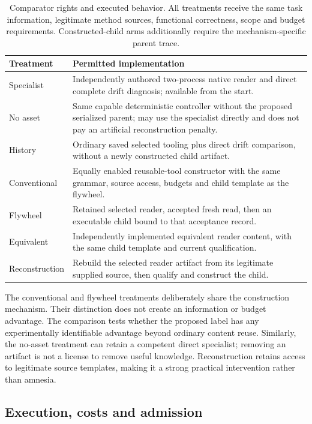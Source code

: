 \documentclass[11pt,a4paper]{article}
\begin{document}
\begin{table}[htbp]\centering\small
\caption{Comparator rights and executed behavior. All treatments receive the same task information, legitimate method sources, functional correctness, scope and budget requirements. Constructed-child arms additionally require the mechanism-specific parent trace.}
\label{tab:arms}
\begin{tabularx}{\textwidth}{@{}l X@{}}\toprule
Treatment & Permitted implementation\\\midrule
Specialist & Independently authored two-process native reader and direct complete drift diagnosis; available from the start.\\
No asset & Same capable deterministic controller without the proposed serialized parent; may use the specialist directly and does not pay an artificial reconstruction penalty.\\
History & Ordinary saved selected tooling plus direct drift comparison, without a newly constructed child artifact.\\
Conventional & Equally enabled reusable-tool constructor with the same grammar, source access, budgets and child template as the flywheel.\\
Flywheel & Retained selected reader, accepted fresh read, then an executable child bound to that acceptance record.\\
Equivalent & Independently implemented equivalent reader content, with the same child template and current qualification.\\
Reconstruction & Rebuild the selected reader artifact from its legitimate supplied source, then qualify and construct the child.\\\bottomrule
\end{tabularx}
\end{table}

The conventional and flywheel treatments deliberately share the construction mechanism. Their distinction does not create an information or budget advantage. The comparison tests whether the proposed label has any experimentally identifiable advantage beyond ordinary content reuse. Similarly, the no-asset treatment can retain a competent direct specialist; removing an artifact is not a license to remove useful knowledge. Reconstruction retains access to legitimate source templates, making it a strong practical intervention rather than amnesia.



\subsection{Execution, costs and admission}
\end{document}

